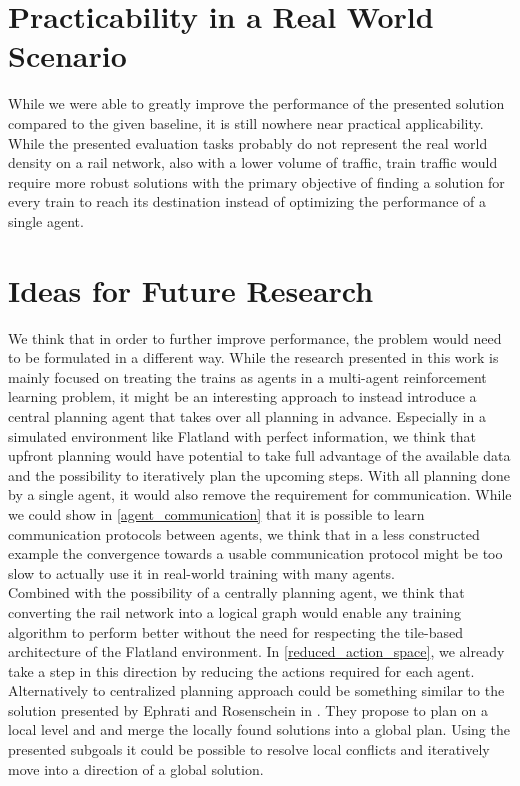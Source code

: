 \section{Practicability in a Real World Scenario}\label{discussion_real_world}
While we were able to greatly improve the performance of the presented solution compared to the given baseline, it is still nowhere near practical applicability. While the presented evaluation tasks probably do not represent the real world density on a rail network, also with a lower volume of traffic, train traffic would require more robust solutions with the primary objective of finding a solution for every train to reach its destination instead of optimizing the performance of a single agent.

\section{Ideas for Future Research}\label{discussion_research}
We think that in order to further improve performance, the problem would need to be formulated in a different way. While the research presented in this work is mainly focused on treating the trains as agents in a multi-agent reinforcement learning problem, it might be an interesting approach to instead introduce a central planning agent that takes over all planning in advance. Especially in a simulated environment like Flatland with perfect information, we think that upfront planning would have potential to take full advantage of the available data and the possibility to iteratively plan the upcoming steps. With all planning done by a single agent, it would also remove the requirement for communication. While we could show in \autoref{agent_communication} that it is possible to learn communication protocols between agents, we think that in a less constructed example the convergence towards a usable communication protocol might be too slow to actually use it in real-world training with many agents.\\
Combined with the possibility of a centrally planning agent, we think that converting the rail network into a logical graph would enable any training algorithm to perform better without the need for respecting the tile-based architecture of the Flatland environment. In \autoref{reduced_action_space}, we already take a step in this direction by reducing the actions required for each agent.\\
Alternatively to centralized planning approach could be something similar to the solution presented by Ephrati and Rosenschein in \cite{Ephrati1993MultiAgentPA}. They propose to plan on a local level and and merge the locally found solutions into a global plan. Using the presented subgoals it could be possible to resolve local conflicts and iteratively move into a direction of a global solution.

